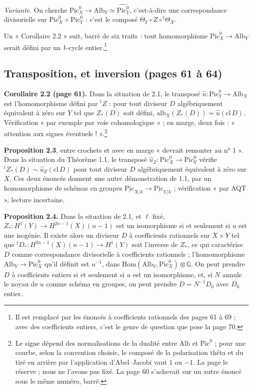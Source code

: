 \documentclass[11pt,a4paper]{article}
\begin{document}
\emph{Variante.} On cherche $\mathrm{Pic}^{0}_{X} \to \mathrm{Alb}_{Y} \simeq
\widehat{\mathrm{Pic}^{0}_{Y}}$, c'est-à-dire une correspondance divisorielle sur
$\mathrm{Pic}^{0}_{X} \times \mathrm{Pic}^{0}_{Y}$ : c'est le composé $\Theta_{Y}
\circ Z \circ {}^{t}\Theta_{X}$.

Un « Corollaire 2.2 » suit, barré de six traits : tout homomorphisme
$\mathrm{Pic}^{0}_{X} \to \mathrm{Alb}_{Y}$ serait défini par un $1$-cycle
entier.\footnote{Il est remplacé par les énoncés à coefficients rationnels des
pages 61 à 69 ; avec des coefficients entiers, c'est le genre de question que
pose la page 70.}

\subsection*{Transposition, et inversion (pages 61 à 64)}

\textbf{Corollaire 2.2 (page 61).} Dans la situation de 2.1, le transposé
$\hat{u} \colon \mathrm{Pic}^{0}_{Y} \to \mathrm{Alb}_{X}$ est l'homomorphisme
défini par ${}^{t}Z$ : pour tout diviseur $D$ algébriquement équivalent à zéro
sur $Y$ tel que $Z_{*}(D)$ soit défini, $\mathrm{alb}_{X}(Z_{*}(D)) =
\hat{u}(\mathrm{cl}\,D)$. Vérification « par exemple par voie cohomologique » ;
en marge, deux fois : « attention aux signes éventuels ! ».\footnote{Le signe
dépend des normalisations de la dualité entre $\mathrm{Alb}$ et
$\mathrm{Pic}^{0}$ ; pour une courbe, selon la convention choisie, le composé
de la polarisation thêta et du tiré en arrière par l'application d'Abel--Jacobi
vaut $1$ ou $-1$. La page le réserve ; nous ne l'avons pas fixé. La page 60
s'achevait sur un autre énoncé sous le même numéro, barré.}

\textbf{Proposition 2.3}, entre crochets et avec en marge « devrait remonter au
n° 1 ». Dans la situation du Théorème 1.1, le transposé $\hat{u}_{Z} \colon
\mathrm{Pic}^{0}_{X} \to \mathrm{Pic}^{0}_{Y}$ vérifie ${}^{t}Z_{*}(D) \sim
\hat{u}_{Z}(\mathrm{cl}\,D)$ pour tout diviseur $D$ algébriquement équivalent à
zéro sur $X$. Ces deux énoncés donnent une autre démonstration de 1.1, par un
homomorphisme de schémas en groupes $\underline{\mathrm{Pic}}_{X/k} \to
\underline{\mathrm{Pic}}_{Y/k}$ ; vérification « par AQT », lecture incertaine.

\textbf{Proposition 2.4.} Dans la situation de 2.1, et $\ell$ fixé,
$Z_{*} \colon H^{1}(Y) \to H^{2n-1}(X)(n-1)$ est un isomorphisme si et seulement
si $u$ est une isogénie. Il existe alors un diviseur $D$ à coefficients
rationnels sur $X \times Y$ tel que ${}^{t}D_{*} \colon H^{2n-1}(X)(n-1) \to
H^{1}(Y)$ soit l'inverse de $Z_{*}$, ce qui caractérise $D$ comme correspondance
divisorielle à coefficients rationnels ; l'homomorphisme
$\mathrm{Alb}_{Y} \to \mathrm{Pic}^{0}_{X}$ qu'il définit est $u^{-1}$, dans
$\mathrm{Hom}(\mathrm{Alb}_{Y}, \mathrm{Pic}^{0}_{X}) \otimes \mathbb{Q}$. On peut
prendre $D$ à coefficients entiers si et seulement si $u$ est un isomorphisme,
et, si $N$ annule le noyau de $u$ comme schéma en groupes, on peut prendre $D =
N^{-1}D_{0}$ avec $D_{0}$ entier.
\end{document}
